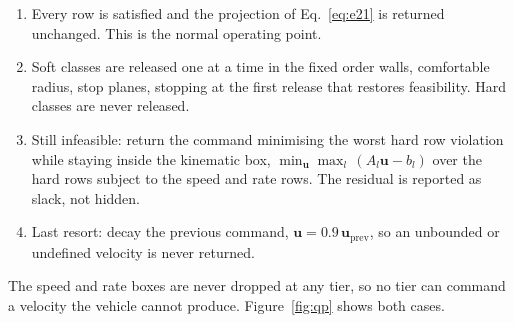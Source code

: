 \documentclass[10pt,letterpaper]{article}
\begin{document}
\begin{enumerate}[nosep,leftmargin=*,topsep=4pt]
    \item[\textbf{Tier 0.}] Every row is satisfied and the projection of
          Eq.~\eqref{eq:e21} is returned unchanged. This is the normal operating point.
    \item[\textbf{Tier 1.}] Soft classes are released one at a time in the fixed order
          walls, comfortable radius, stop planes, stopping at the first release that
          restores feasibility. Hard classes are never released.
    \item[\textbf{Tier 2.}] Still infeasible: return the command minimising the worst hard
          row violation while staying inside the kinematic box,
          $\min_{\mathbf{u}}\max_l\,(A_l\mathbf{u}-b_l)$ over the hard rows subject to the
          speed and rate rows. The residual is reported as slack, not hidden.
    \item[\textbf{Tier 3.}] Last resort: decay the previous command,
          $\mathbf{u}=0.9\,\mathbf{u}_{\mathrm{prev}}$, so an unbounded or undefined
          velocity is never returned.
\end{enumerate}

The speed and rate boxes are never dropped at any tier, so no tier can command a velocity
the vehicle cannot produce. Figure~\ref{fig:qp} shows both cases.
\end{document}

